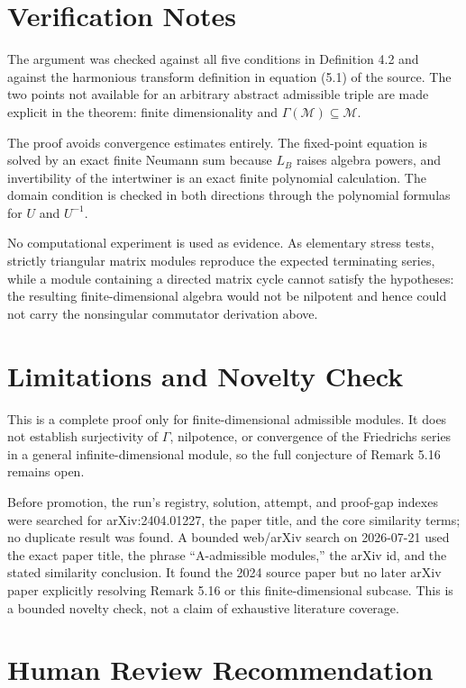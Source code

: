 \documentclass[11pt]{article}
\begin{document}
\section*{Verification Notes}

The argument was checked against all five conditions in Definition 4.2 and
against the harmonious transform definition in equation (5.1) of the source.
The two points not available for an arbitrary abstract admissible triple are
made explicit in the theorem: finite dimensionality and
\(\Gamma(\mathcal M)\subseteq\mathcal M\).

The proof avoids convergence estimates entirely.  The fixed-point equation
is solved by an exact finite Neumann sum because \(L_B\) raises algebra
powers, and invertibility of the intertwiner is an exact finite polynomial
calculation.  The domain condition is checked in both directions through the
polynomial formulas for \(U\) and \(U^{-1}\).

No computational experiment is used as evidence.  As elementary stress
tests, strictly triangular matrix modules reproduce the expected terminating
series, while a module containing a directed matrix cycle cannot satisfy the
hypotheses: the resulting finite-dimensional algebra would not be nilpotent
and hence could not carry the nonsingular commutator derivation above.

\section*{Limitations and Novelty Check}

This is a complete proof only for finite-dimensional admissible modules.  It
does not establish surjectivity of \(\Gamma\), nilpotence, or convergence of
the Friedrichs series in a general infinite-dimensional module, so the full
conjecture of Remark 5.16 remains open.

Before promotion, the run's registry, solution, attempt, and proof-gap indexes
were searched for arXiv:2404.01227, the paper title, and the core similarity
terms; no duplicate result was found.  A bounded web/arXiv search on
2026-07-21 used the exact paper title, the phrase ``A-admissible modules,''
the arXiv id, and the stated similarity conclusion.  It found the 2024 source
paper but no later arXiv paper explicitly resolving Remark 5.16 or this
finite-dimensional subcase.  This is a bounded novelty check, not a claim of
exhaustive literature coverage.

\section*{Human Review Recommendation}
\end{document}
